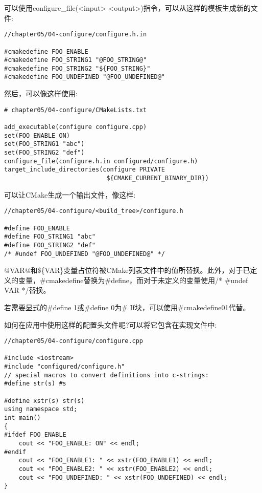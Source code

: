 可以使用configure\_file(<input> <output>)指令，可以从这样的模板生成新的文件:

\begin{lstlisting}[style=styleCXX]
//chapter05/04-configure/configure.h.in

#cmakedefine FOO_ENABLE
#cmakedefine FOO_STRING1 "@FOO_STRING@"
#cmakedefine FOO_STRING2 "${FOO_STRING}"
#cmakedefine FOO_UNDEFINED "@FOO_UNDEFINED@"
\end{lstlisting}  

然后，可以像这样使用:

\begin{lstlisting}[style=styleCMake]
# chapter05/04-configure/CMakeLists.txt

add_executable(configure configure.cpp)
set(FOO_ENABLE ON)
set(FOO_STRING1 "abc")
set(FOO_STRING2 "def")
configure_file(configure.h.in configured/configure.h)
target_include_directories(configure PRIVATE
							${CMAKE_CURRENT_BINARY_DIR})
\end{lstlisting}  

可以让CMake生成一个输出文件，像这样:

\begin{lstlisting}[style=styleCXX]
//chapter05/04-configure/<build_tree>/configure.h
	
#define FOO_ENABLE
#define FOO_STRING1 "abc"
#define FOO_STRING2 "def"
/* #undef FOO_UNDEFINED "@FOO_UNDEFINED@" */
\end{lstlisting}  

@VAR@和\$\{VAR\}变量占位符被CMake列表文件中的值所替换。此外，对于已定义的变量，\#cmakedefine替换为\#define，而对于未定义的变量使用/* \#undef VAR */替换。

若需要显式的\#define 1或\#define 0为\# If块，可以使用\#cmakedefine01代替。

如何在应用中使用这样的配置头文件呢?可以将它包含在实现文件中:

\begin{lstlisting}[style=styleCXX]
//chapter05/04-configure/configure.cpp

#include <iostream>
#include "configured/configure.h"
// special macros to convert definitions into c-strings:
#define str(s) #s

#define xstr(s) str(s)
using namespace std;
int main()
{
#ifdef FOO_ENABLE
	cout << "FOO_ENABLE: ON" << endl;
#endif
	cout << "FOO_ENABLE1: " << xstr(FOO_ENABLE1) << endl;
	cout << "FOO_ENABLE2: " << xstr(FOO_ENABLE2) << endl;
	cout << "FOO_UNDEFINED: " << xstr(FOO_UNDEFINED) << endl;
}
\end{lstlisting}

